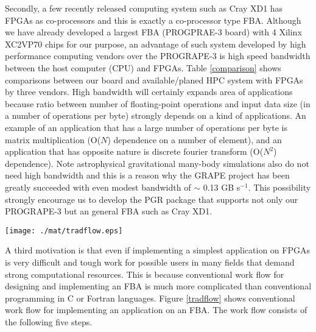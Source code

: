 \documentclass{llncs}
\begin{document}
Secondly, a few recently released computing system such as Cray XD1 
has FPGAs as co-processors and this is exactly a co-processor type FBA.
Although we have already developed a largest FBA (PROGPRAE-3 board)
with 4 Xilinx XC2VP70 chips for our purpose, 
an advantage of such system developed by high performance computing vendors
over the PROGRAPE-3 is high speed bandwidth between the host computer (CPU)
and FPGAs. Table \ref{comparison} shows comparisons between our board
and available/planed HPC system with FPGAs by three vendors.
High bandwidth will certainly expands area of applications because ratio between 
number of floating-point operations and input data size (in a number of operations per byte)
strongly depends on a kind of applications. 
An example of an application that has a large number of operations per byte
is matrix multiplication (O($N$) dependence on a number of element),
and an application that has opposite nature is discrete fourier transform (O($N^2$) dependence).
Note astrophysical gravitational many-body simulations also do not need high bandwidth
and this is a reason why the GRAPE project has been greatly succeeded 
with even modest bandwidth of $\sim$ 0.13 GB s$^{-1}$.
This possibility strongly encourage us to develop the PGR package
that supports not only our PROGRAPE-3 but an general FBA such as Cray XD1.

\begin{figure*}[htb]
\begin{center}
\texttt{[image: ./mat/tradflow.eps]}
\caption{Conventional work flow for implementing an application on a RS system.}
\label{tradflow}
\end{center}
\end{figure*}

A third motivation is that even if implementing a simplest
application on FPGAs is very difficult and tough work for
possible users in many fields that demand strong computational resources.
This is because conventional work flow for designing and implementing
an FBA is much more complicated than 
conventional programming in C or Fortran languages.
Figure \ref{tradflow} shows conventional work flow for
implementing an application on an FBA.
The work flow consists of the following five steps.
\end{document}

